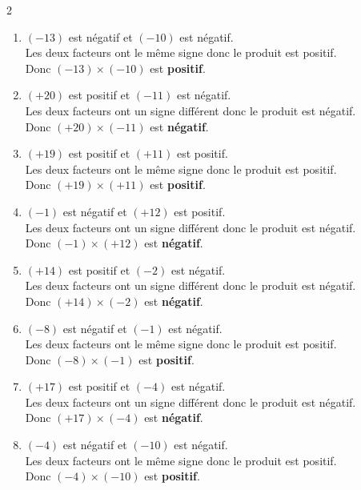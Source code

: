 \begin{corrige}
    \phantom{rrr}    
    \begin{multicols}2
        \begin{enumerate}
            \item $ (-13) $ est négatif et $ (-10) $ est négatif.\\
            Les deux facteurs ont le même signe donc le produit est positif.\\
           Donc $ (-13) \times (-10) $ est {\bfseries \color[HTML]{f15929}positif}.
               \item $ (+20) $ est positif et $ (-11) $ est négatif.\\
            Les deux facteurs ont un signe différent donc le produit est négatif.\\
           Donc $ (+20) \times (-11) $ est {\bfseries \color[HTML]{f15929}négatif}.
               \item $ (+19) $ est positif et $ (+11) $ est positif.\\
            Les deux facteurs ont le même signe donc le produit est positif.\\
           Donc $ (+19) \times (+11) $ est {\bfseries \color[HTML]{f15929}positif}.
               \item $ (-1) $ est négatif et $ (+12) $ est positif.\\
            Les deux facteurs ont un signe différent donc le produit est négatif.\\
           Donc $ (-1) \times (+12) $ est {\bfseries \color[HTML]{f15929}négatif}.
               \item $ (+14) $ est positif et $ (-2) $ est négatif.\\
            Les deux facteurs ont un signe différent donc le produit est négatif.\\
           Donc $ (+14) \times (-2) $ est {\bfseries \color[HTML]{f15929}négatif}.
               \item $ (-8) $ est négatif et $ (-1) $ est négatif.\\
            Les deux facteurs ont le même signe donc le produit est positif.\\
           Donc $ (-8) \times (-1) $ est {\bfseries \color[HTML]{f15929}positif}.
               \item $ (+17) $ est positif et $ (-4) $ est négatif.\\
            Les deux facteurs ont un signe différent donc le produit est négatif.\\
           Donc $ (+17) \times (-4) $ est {\bfseries \color[HTML]{f15929}négatif}.
               \item $ (-4) $ est négatif et $ (-10) $ est négatif.\\
            Les deux facteurs ont le même signe donc le produit est positif.\\
           Donc $ (-4) \times (-10) $ est {\bfseries \color[HTML]{f15929}positif}.
        \end{enumerate}
    \end{multicols}
\end{corrige}